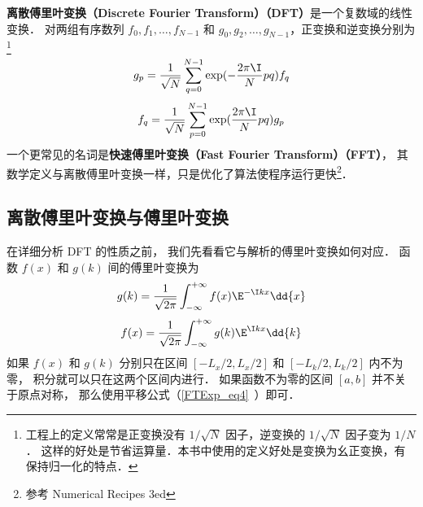 
\textbf{离散傅里叶变换（Discrete Fourier Transform）（DFT）}是一个复数域的线性变换． 对两组有序数列 $f_0, f_1, \dots, f_{N-1}$ 和 $g_0,g_2,\dots, g_{N-1}$，正变换和逆变换分别为\footnote{工程上的定义常常是正变换没有 $1/\sqrt{N}$ 因子，逆变换的 $1/\sqrt{N}$ 因子变为 $1/N$． 这样的好处是节省运算量．本书中使用的定义好处是变换为幺正变换，有保持归一化的特点．}
\begin{equation}\label{DFT_eq1}
g_p = \frac{1}{\sqrt{N}}\sum_{q=0}^{N-1} \exp(-\frac{2\pi\I}{N} p q ) f_q
\end{equation}
\begin{equation}\label{DFT_eq2}
f_q = \frac{1}{\sqrt{N}}\sum_{p=0}^{N-1} \exp(\frac{2\pi\I}{N} p q) g_p
\end{equation}
一个更常见的名词是\textbf{快速傅里叶变换（Fast Fourier Transform）（FFT）}， 其数学定义与离散傅里叶变换一样，只是优化了算法使程序运行更快\footnote{参考 Numerical Recipes 3ed}．

\subsection{离散傅里叶变换与傅里叶变换}
在详细分析 DFT 的性质之前， 我们先看看它与解析的傅里叶变换如何对应． 函数 $f(x)$ 和 $g(k)$ 间的傅里叶变换为
\begin{equation}\label{DFT_eq3}
g(k) = \frac{1}{\sqrt{2\pi}} \int_{-\infty}^{+\infty} f(x)\E^{-\I kx} \dd{x}
\end{equation}
\begin{equation}\label{DFT_eq4}
f(x) = \frac{1}{\sqrt{2\pi}} \int_{-\infty}^{+\infty} g(k)\E^{\I kx} \dd{k}
\end{equation}
如果 $f(x)$ 和 $g(k)$ 分别只在区间 $[-L_x/2, L_x/2]$ 和 $[-L_k/2, L_k/2]$ 内不为零， 积分就可以只在这两个区间内进行． 如果函数不为零的区间 $[a,b]$ 并不关于原点对称， 那么使用平移公式（\autoref{FTExp_eq4}~）即可．

